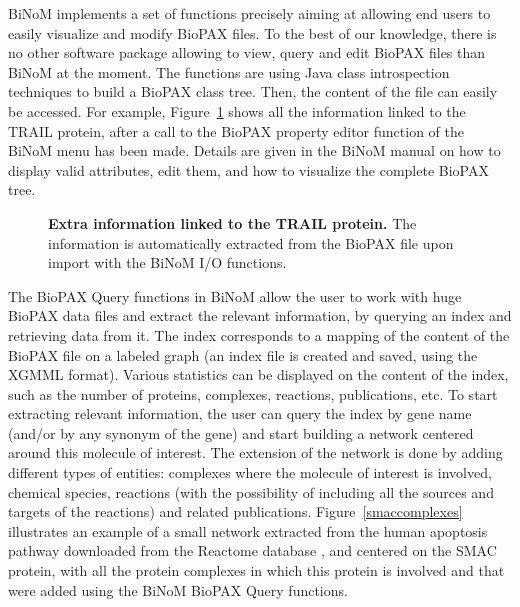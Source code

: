 \documentclass[10pt]{bmc_article}
\newenvironment{bmcformat}{\baselineskip20pt\sloppy\setboolean{publ}{false}}{\baselineskip20pt\sloppy}
\begin{document}
\begin{bmcformat}
BiNoM implements a set of functions precisely aiming at allowing end users to
easily visualize and modify BioPAX files. To the best of our knowledge, there is
no other software package allowing to view, query and edit BioPAX files than
BiNoM at the moment. The functions are using
Java class introspection techniques to build a BioPAX class tree. Then, the
content of the file can easily be accessed. For example, Figure~\ref{biopaxtrailprop} shows
all the information linked to the TRAIL protein, after a call to the
BioPAX property
editor function of the BiNoM menu has been made. Details are given in the BiNoM manual on how
to display valid attributes, edit them, and how to visualize the
complete BioPAX tree.


\begin{figure}[h]
 \caption{\label{biopaxtrailprop}  \textbf{Extra information linked to the TRAIL protein.}
      The information is automatically extracted from the BioPAX file upon
import with the BiNoM I/O functions.}
\end{figure}


The BioPAX Query functions in BiNoM allow the user to work with huge
BioPAX data files and extract the relevant information, by querying an index and
retrieving data from it. The index corresponds to a mapping of the content of
the BioPAX file on a labeled graph (an index file is created and saved, using
the XGMML format). Various statistics can be displayed on the content of the
index, such as the number of proteins, complexes, reactions, publications, etc.
To start extracting relevant information, the user can query the index by gene
name (and/or by any synonym of the gene) and start building a network centered
around this molecule of interest. The extension of the network is done by adding
different types of entities: complexes where the molecule of interest is
involved, chemical species, reactions (with the possibility of including all the
sources and targets of the reactions) and related publications. Figure~\ref{smaccomplexes}
illustrates an example of a small network extracted from the human apoptosis
pathway downloaded from the Reactome database \cite{joshi2005reactome}, and
centered on the SMAC protein, with all the protein complexes in which
this protein is involved and that were added using the BiNoM BioPAX Query functions.


\end{bmcformat}
\end{document}
